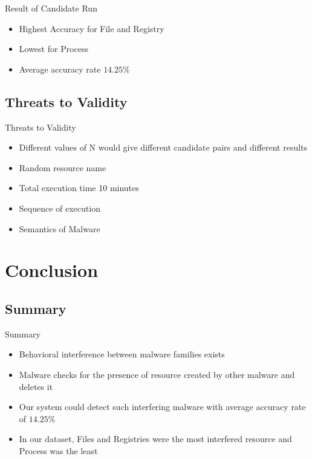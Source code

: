 \documentclass[]{beamer}
\begin{document}
\begin{frame}[t]{Result of Candidate Run}
\begin{itemize}
  \item Highest Accuracy for File and Registry
  \item Lowest for Process
  \item Average accuracy rate $14.25\%$
\end{itemize}
\end{frame}
\subsection{Threats to Validity}
\label{sub:Threats to Validity}
\begin{frame}[t]{Threats to Validity}
  \begin{itemize}
    \item Different values of N would give different candidate pairs and different results
    \item Random resource name
    \item Total execution time 10 minutes
    \item Sequence of execution
    \item Semantics of Malware
  \end{itemize}
\end{frame}


\section{Conclusion}
\subsection{Summary}
\label{sub:Summary}
\begin{frame}[t]{Summary}
  \begin{itemize}
    \item Behavioral interference between malware families exists
    \item Malware checks for the presence of resource created by other malware and deletes it
    \item Our system could detect such interfering malware with average accuracy rate of $14.25\%$
    \item In our dataset, Files and Registries were the most interfered resource and Process was the least
  \end{itemize}
\end{frame}
\end{document}
